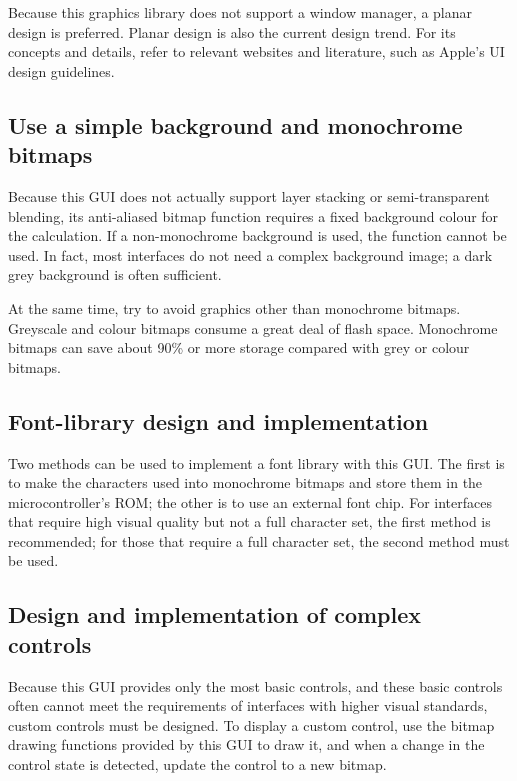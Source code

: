 Because this graphics library does not support a window manager, a planar design is preferred.
Planar design is also the current design trend.
For its concepts and details, refer to relevant websites and literature, such as Apple's UI design guidelines.

\subsection{Use a simple background and monochrome bitmaps}

Because this GUI does not actually support layer stacking or semi-transparent blending, its anti-aliased bitmap function requires a fixed background colour for the calculation.
If a non-monochrome background is used, the function cannot be used.
In fact, most interfaces do not need a complex background image; a dark grey background is often sufficient.

At the same time, try to avoid graphics other than monochrome bitmaps.
Greyscale and colour bitmaps consume a great deal of flash space.
Monochrome bitmaps can save about 90\% or more storage compared with grey or colour bitmaps.

\subsection{Font-library design and implementation}

Two methods can be used to implement a font library with this GUI.
The first is to make the characters used into monochrome bitmaps and store them in the microcontroller's ROM; the other is to use an external font chip.
For interfaces that require high visual quality but not a full character set, the first method is recommended; for those that require a full character set, the second method must be used.

\subsection{Design and implementation of complex controls}

Because this GUI provides only the most basic controls, and these basic controls often cannot meet the requirements of interfaces with higher visual standards, custom controls must be designed.
To display a custom control, use the bitmap drawing functions provided by this GUI to draw it, and when a change in the control state is detected, update the control to a new bitmap.

